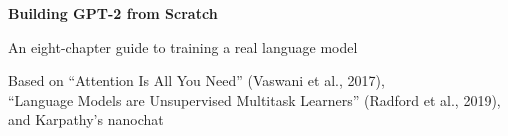 


\begin{titlepage}
\centering
\vspace*{4cm}
{\Huge\bfseries Building GPT-2 from Scratch\par}
\vspace{1.5cm}
{\Large An eight-chapter guide to training a real language model\par}
\vspace{2cm}
{\large Based on ``Attention Is All You Need'' (Vaswani et al., 2017),\\
``Language Models are Unsupervised Multitask Learners'' (Radford et al., 2019),\\
and Karpathy's nanochat\par}
\vfill
\end{titlepage}

\tableofcontents










\appendix




